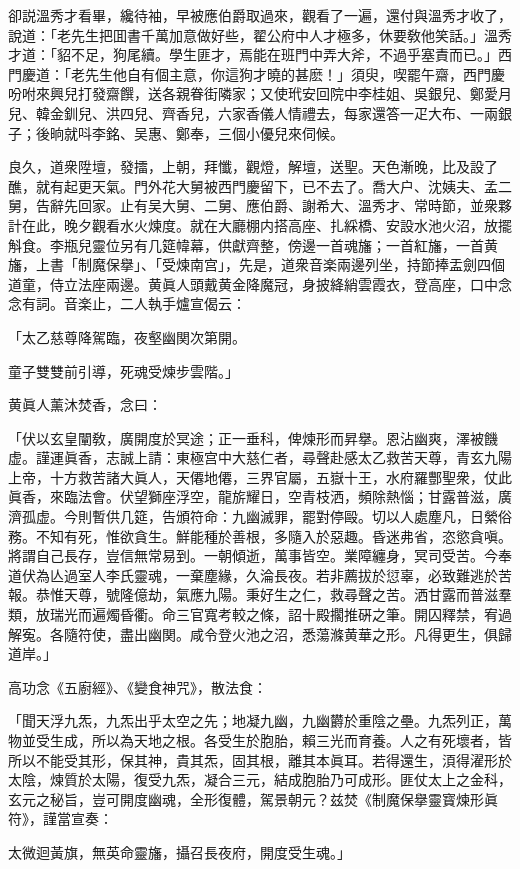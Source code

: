 卻説溫秀才看畢，纔待袖，早被應伯爵取過來，觀看了一遍，還付與溫秀才收了，說道：「老先生把囬書千萬加意做好些，翟公府中人才極多，休要敎他笑話。」溫秀才道：「貂不足，狗尾續。學生匪才，焉能在班門中弄大斧，不過乎塞責而已。」西門慶道：「老先生他自有個主意，你這狗才曉的甚麽！」須臾，喫罷午齋，西門慶吩咐來興兒打發齋饌，送各親眷街隣家；又使玳安回院中李桂姐、吳銀兒、鄭愛月兒、韓金釧兒、洪四兒、齊香兒，六家香儀人情禮去，每家還答一疋大布、一兩銀子；後晌就呌李銘、吴惠、鄭奉，三個小優兒來伺候。

良久，道衆陞壇，發擂，上朝，拜懺，觀燈，解壇，送聖。天色漸晚，比及設了醮，就有起更天氣。門外花大舅被西門慶留下，已不去了。喬大户、沈姨夫、孟二舅，告辭先回家。止有吴大舅、二舅、應伯爵、謝希大、溫秀才、常時節，並衆夥計在此，晚夕觀看水火煉度。就在大廳棚内搭高座、扎綵橋、安設水池火沼，放擺斛食。李瓶兒靈位另有几筵幃幕，供獻齊整，傍邊一首魂旛；一首紅旛，一首黄旛，上書「制魔保擧」、「受煉南宫」，先是，道衆音楽兩邊列坐，持節捧盂劍四個道童，侍立法座兩邊。黄眞人頭戴黄金降魔冠，身披絳綃雲霞衣，登高座，口中念念有詞。音楽止，二人執手爐宣偈云：

\begin{myquote}
「太乙慈尊降駕臨，夜壑幽関次第開。

童子雙雙前引導，死魂受煉步雲階。」
\end{myquote}

黄眞人薰沐焚香，念曰：

\begin{myquote}[\markfont]
「伏以玄皇闡敎，廣開度於冥途；正一垂科，俾煉形而昇擧。恩沾幽爽，澤被饑虚。謹運眞香，志誠上請：東極宫中大慈仁者，尋聲赴感太乙救苦天尊，青玄九陽上帝，十方救苦諸大眞人，天僊地僊，三界官屬，五嶽十王，水府羅酆聖衆，仗此眞香，來臨法會。伏望獅座浮空，龍旂耀日，空青枝洒，頻除熱惱；甘露普滋，廣濟孤虚。今則暫供几筵，告頒符命：九幽滅罪，罷對停毆。切以人處塵凡，日縈俗務。不知有死，惟欲貪生。鮮能種於善根，多隨入於惡趣。昏迷弗省，恣慾貪嗔。將謂自己長存，豈信無常易到。一朝傾逝，萬事皆空。業障纏身，冥司受苦。今奉道伏為亾過室人李氏靈魂，一棄塵緣，久淪長夜。若非薦拔於愆辜，必致難逃於苦報。恭惟天尊，號隆億劫，氣應九陽。秉好生之仁，救尋聲之苦。洒甘露而普滋羣類，放瑞光而遍燭昏衢。命三官寬考較之條，詔十殿擱推硏之筆。開囚釋禁，宥過解寃。各隨符使，盡出幽関。咸令登火池之沼，悉蕩滌黄華之形。凡得更生，俱歸道岸。」
\end{myquote}

高功念《五廚經》、《變食神咒》，散法食：

\begin{myquote}[\markfont]
「聞天浮九炁，九炁出乎太空之先；地凝九幽，九幽欝於重陰之壘。九炁列正，萬物並受生成，所以為天地之根。各受生於胞胎，賴三光而育養。人之有死壞者，皆所以不能受其形，保其神，貴其炁，固其根，離其本眞耳。若得還生，湏得濯形於太陰，煉質於太陽，復受九炁，凝合三元，結成胞胎乃可成形。匪仗太上之金科，玄元之秘旨，豈可開度幽魂，全形復體，駕景朝元？兹焚《制魔保擧靈寳煉形眞符》，謹當宣奏：

太微迴黃旗，無英命靈旛，攝召長夜府，開度受生魂。」
\end{myquote}

